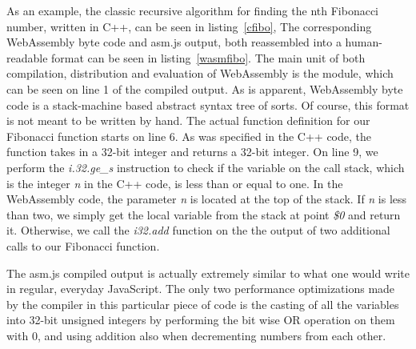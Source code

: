 \documentclass[conference]{IEEEtran}
\begin{document}
As an example, the classic recursive algorithm for finding the nth Fibonacci
number, written in C++, can be seen in listing~\ref{cfibo}, The corresponding
WebAssembly byte code and asm.js output, both reassembled into a human-readable
format can be seen in listing~\ref{wasmfibo}. The main unit of both
compilation, distribution and evaluation of WebAssembly is the module, which
can be seen on line 1 of the compiled output. As is apparent, WebAssembly
byte code is a stack-machine based abstract syntax tree of sorts. Of course,
this format is not meant to be written by hand. The actual function definition
for our Fibonacci function starts on line 6. As was specified in the C++ code,
the function takes in a 32-bit integer and returns a 32-bit integer. On line 9,
we perform the \emph{i.32.ge\_s} instruction to check if the variable on the
call stack, which is the integer \emph{n} in the C++ code, is less than or
equal to one. In the WebAssembly code, the parameter \emph{n} is located at the
top of the stack. If \emph{n} is less than two, we simply get the local
variable from the stack at point \emph{\$0} and return it. Otherwise, we call
the \emph{i32.add} function on the the output of two additional calls to our
Fibonacci function.

The asm.js compiled output is actually extremely similar to what one would
write in regular, everyday JavaScript. The only two performance optimizations
made by the compiler in this particular piece of code is the casting of all the
variables into 32-bit unsigned integers by performing the bit wise OR operation
on them with 0, and using addition also when decrementing numbers from each
other.
\end{document}

